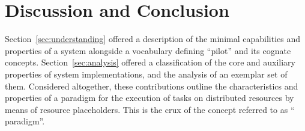 \documentclass{sig-alternate}
\begin{document}




%
\section{Discussion and Conclusion}
\label{sec:discussion}




Section~\ref{sec:understanding} offered a description of the minimal
capabilities and properties of a \pilot system alongside a vocabulary defining
``pilot'' and its cognate concepts. Section~\ref{sec:analysis} offered a
classification of the core and auxiliary properties of \pilot system
implementations, and the analysis of an exemplar set of them. Considered
altogether, these contributions outline the characteristics and properties of a
paradigm for the execution of tasks on distributed resources by means of
resource placeholders. This is the crux of the concept referred to as ``\pilot
paradigm''.
\end{document}
